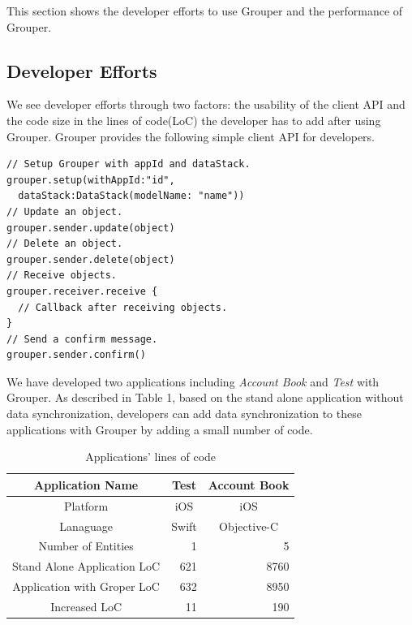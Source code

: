 \documentclass[twocolumn,10pt]{article}
\begin{document}
This section shows the developer efforts to use Grouper and the performance of Grouper.

\subsection{Developer Efforts}

We see developer efforts through two factors: the usability of the client API and the code size in the lines of code(LoC) the developer has to add after using Grouper. 
Grouper provides the following simple client API for developers.

\begin{lstlisting}
// Setup Grouper with appId and dataStack.
grouper.setup(withAppId:"id",
  dataStack:DataStack(modelName: "name"))
// Update an object.
grouper.sender.update(object)
// Delete an object.
grouper.sender.delete(object)
// Receive objects.
grouper.receiver.receive { 
  // Callback after receiving objects.
}
// Send a confirm message.
grouper.sender.confirm()
\end{lstlisting}

We have developed two applications including \emph{Account Book} and \emph{Test} with Grouper. 
As described in Table 1, based on the stand alone application without data synchronization, developers can add data synchronization to these applications with Grouper by adding a small number of code. 

\begin{table}[!htb]
	\footnotesize
	\centering  
	\caption{Applications' lines of code}
	\begin{tabular}{c|c|c}
		\hline
		Application Name           & Test  & Account Book \\ \hline
		Platform            & iOS   & iOS          \\ \hline
		Lanaguage           & Swift & Objective-C  \\ \hline
		Number of Entities  & \multicolumn{1}{r|}{1}     & \multicolumn{1}{r}{5}            \\ \hline
		Stand Alone Application LoC     & \multicolumn{1}{r|}{621}   & \multicolumn{1}{r}{8760}         \\ \hline
		Application with Groper LoC     &  \multicolumn{1}{r|}{632}   & \multicolumn{1}{r}{8950}         \\ \hline
		Increased LoC & \multicolumn{1}{r|}{11}    & \multicolumn{1}{r}{190}           \\ \hline
	\end{tabular}
\end{table}
\end{document}
